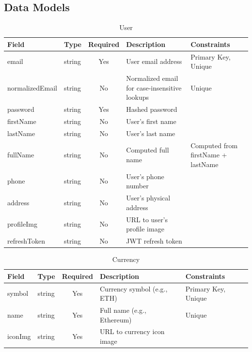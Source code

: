 \subsection{Data Models}
\begin{table}[htbp]
  \centering
  \caption{User}
  \renewcommand{\arraystretch}{1.5}
  \begin{tabular}{|p{3cm}|p{2cm}|c|p{4cm}|p{4cm}|}
    \hline
    \textbf{Field} & \textbf{Type} & \textbf{Required} & \textbf{Description} & \textbf{Constraints} \\
    \hline
    email & string & Yes & User email address & Primary Key, Unique \\
    \hline
    normalizedEmail & string & No & Normalized email for case-insensitive lookups & Unique \\
    \hline
    password & string & Yes & Hashed password & \\
    \hline
    firstName & string & No & User's first name & \\
    \hline
    lastName & string & No & User's last name & \\
    \hline
    fullName & string & No & Computed full name & Computed from firstName + lastName \\
    \hline
    phone & string & No & User's phone number & \\
    \hline
    address & string & No & User's physical address & \\
    \hline
    profileImg & string & No & URL to user's profile image & \\
    \hline
    refreshToken & string & No & JWT refresh token & \\
    \hline
  \end{tabular}
\end{table}

\begin{table}[htbp]
  \centering
  \caption{Currency}
  \renewcommand{\arraystretch}{1.5}
  \begin{tabular}{|p{3cm}|p{2cm}|c|p{4cm}|p{4cm}|}
    \hline
    \textbf{Field} & \textbf{Type} & \textbf{Required} & \textbf{Description} & \textbf{Constraints} \\
    \hline
    symbol & string & Yes & Currency symbol (e.g., ETH) & Primary Key, Unique \\
    \hline
    name & string & Yes & Full name (e.g., Ethereum) & Unique \\
    \hline
    iconImg & string & Yes & URL to currency icon image & \\
    \hline
  \end{tabular}
\end{table}

